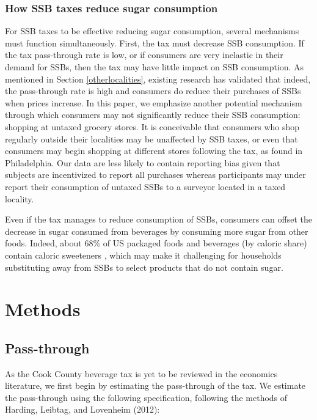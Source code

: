 \documentclass[12pt]{article}
\begin{document}
\subsubsection{How SSB taxes reduce sugar consumption}

For SSB taxes to be effective reducing sugar consumption, several mechanisms must function simultaneously. First, the tax must decrease SSB consumption. If the tax pass-through rate is low, or if consumers are very inelastic in their demand for SSBs, then the tax may have little impact on SSB consumption. As mentioned in Section \ref{otherlocalities}, existing research has validated that indeed, the pass-through rate is high and consumers do reduce their purchases of SSBs when prices increase. In this paper, we emphasize another potential mechanism through which consumers may not significantly reduce their SSB consumption: shopping at untaxed grocery stores. It is conceivable that consumers who shop regularly outside their localities may be unaffected by SSB taxes, or even that consumers may begin shopping at different stores following the tax, as \textcite{cawley2020philly} found in Philadelphia. Our data are less likely to contain reporting bias given that subjects are incentivized to report all purchases whereas participants may under report their consumption of untaxed SSBs to a surveyor located in a taxed locality.

Even if the tax manages to reduce consumption of SSBs, consumers can offset the decrease in sugar consumed from beverages by consuming more sugar from other foods. Indeed, about 68\% of US packaged foods and beverages (by caloric share) contain caloric sweeteners \parencite{popkin2016sweetening}, which may make it challenging for households substituting away from SSBs to select products that do not contain sugar.


\section{Methods} \label{methods}

\subsection{Pass-through}

As the Cook County beverage tax is yet to be reviewed in the economics literature, we first begin by estimating the pass-through of the tax. We estimate the pass-through using the following specification, following the methods of Harding, Leibtag, and Lovenheim (2012):
\end{document}
